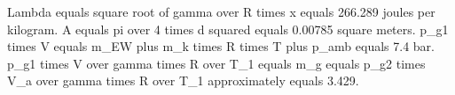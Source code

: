 Lambda equals square root of gamma over R times x equals 266.289 joules per kilogram.  
A equals pi over 4 times d squared equals 0.00785 square meters.  
p_g1 times V equals m_EW plus m_k times R times T plus p_amb equals 7.4 bar.  
p_g1 times V over gamma times R over T_1 equals m_g equals p_g2 times V_a over gamma times R over T_1 approximately equals 3.429.